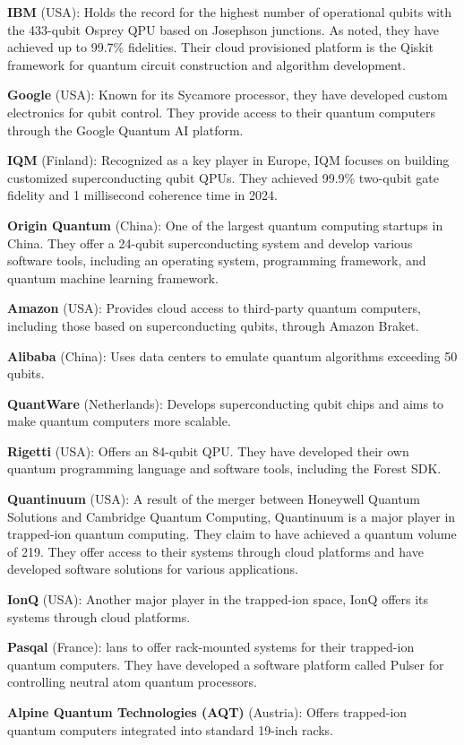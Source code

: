 \begin{enumeration}
\item \textbf{IBM} (USA): Holds the record for the highest number of operational qubits with the 433-qubit Osprey QPU
  \cite{IBM:ossprey:2024} based on Josephson junctions.
  As noted, they have achieved up to 99.7\% fidelities.
  Their cloud provisioned platform is the Qiskit \cite{IBM:qiskit:2023} framework for quantum circuit construction and
  algorithm development.
\item \textbf{Google} (USA): Known for its Sycamore processor, they have developed custom electronics for qubit control.
  They provide access to their quantum computers through the Google Quantum AI platform.
\item \textbf{IQM} (Finland): Recognized as a key player in Europe, IQM focuses on building customized superconducting
  qubit QPUs.
  They achieved 99.9\% two-qubit gate fidelity and 1 millisecond coherence time in 2024.
\item \textbf{Origin Quantum} (China):  One of the largest quantum computing startups in China.
  They offer a 24-qubit superconducting system and develop various software tools, including an operating system,
  programming framework, and quantum machine learning framework.
\item \textbf{Amazon} (USA):  Provides cloud access to third-party quantum computers, including those based on
  superconducting qubits, through Amazon Braket.
\item \textbf{Alibaba} (China): Uses data centers to emulate quantum algorithms exceeding 50 qubits.
\item \textbf{QuantWare} (Netherlands):  Develops superconducting qubit chips and aims to make quantum computers more scalable.
\item \textbf{Rigetti} (USA): Offers an 84-qubit QPU.
 They have developed their own quantum programming language and software tools, including the Forest SDK.
\item \textbf{Quantinuum} (USA): A result of the merger between Honeywell Quantum Solutions and Cambridge Quantum Computing,
  Quantinuum is a major player in trapped-ion quantum computing.
 They claim to have achieved a quantum volume of 219.
 They offer access to their systems through cloud platforms and have developed software solutions for various applications.
\item \textbf{IonQ} (USA): Another major player in the trapped-ion space, IonQ offers its systems through cloud platforms.
\item \textbf{Pasqal} (France): lans to offer rack-mounted systems for their trapped-ion quantum computers.
 They have developed a software platform called Pulser for controlling neutral atom quantum processors.
\item \textbf{Alpine Quantum Technologies (AQT)} (Austria): Offers trapped-ion quantum computers integrated into
  standard 19-inch racks.
\end{enumeration}

